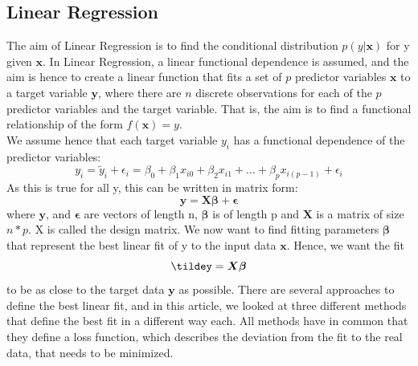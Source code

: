 \documentclass[11pt,a4paper]{article}
\begin{document}
\subsection{Linear Regression}
The aim of Linear Regression is to find the conditional distribution $p(y|\bm{x})$ for y given $\bm{x}$. In Linear Regression, a linear functional dependence is assumed, and the aim is hence to create a linear function that fits a set of $p$ predictor variables $\bm{x}$ to a target variable $\bm{y}$, where there are $n$ discrete observations for each of the $p$ predictor variables and the target variable. That is, the aim is to find a functional relationship of the form $f(\bm{x})=y$. \\
We assume hence that each target variable $y_i$ has a functional dependence of the predictor variables:
\begin{equation*}
y_i= \tilde y_i+\epsilon_i=\beta_0 + \beta_1x_{i0} + \beta_2x_{i1}+...+\beta_px_{i(p-1)} + \epsilon_i
\end{equation*}
As this is true for all y, this can be written in matrix form:
\begin{equation*}
\bm{y}= \bm{X\beta} + \bm{\epsilon}
\end{equation*}
where $\bm{y}$, and $\bm{\epsilon}$ are vectors of length n,  $\bm{\beta}$ is of length p and $\bm{X}$ is a matrix of size $n*p$. X is called the design matrix.
 We now want to find fitting parameters $\bm{\beta}$ that represent the best linear fit of y to the input data $\bm{x}$. Hence, we want the fit
 \begin{equation*}
 \bm{\tildey}= \bm{X\beta}
 \end{equation*}
 to be as close to the target data $\bm{y}$ as possible.
  There are several approaches to define the best linear fit, and in this article, we looked at three different methods that define the best fit in a different way each. All methods have in common that they define a loss function, which describes the deviation from the fit to the real data, that needs to be minimized.
\end{document}
